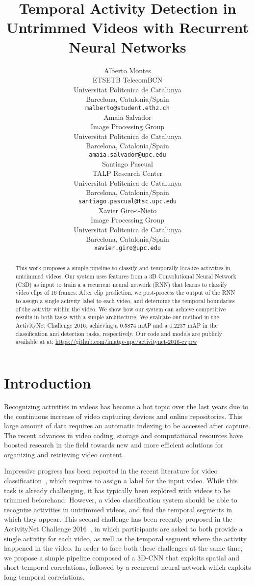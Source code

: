 \documentclass{article}
\title{Temporal Activity Detection in Untrimmed Videos with Recurrent Neural Networks}
\author{
    Alberto Montes \\
    ETSETB TelecomBCN\\
    Universitat Politcnica de Catalunya \\
    Barcelona, Catalonia/Spain \\
    \texttt{malberto@student.ethz.ch} \\
    \And
    Amaia Salvador \\
    Image Processing Group \\
    Universitat Politcnica de Catalunya \\
    Barcelona, Catalonia/Spain \\
    \texttt{amaia.salvador@upc.edu} \\
    \And
    Santiago Pascual \\
    TALP Research Center \\
    Universitat Politcnica de Catalunya \\
    Barcelona, Catalonia/Spain \\
    \texttt{santiago.pascual@tsc.upc.edu} \\
    \And
    Xavier Giro-i-Nieto \\
    Image Processing Group \\
    Universitat Politcnica de Catalunya \\
    Barcelona, Catalonia/Spain \\
    \texttt{xavier.giro@upc.edu} \\
}
\begin{document}
\maketitle

\begin{abstract}


    This work proposes a simple pipeline to classify and temporally localize activities in untrimmed videos. Our system uses features from a 3D Convolutional Neural Network (C3D) as input to train a a recurrent neural network (RNN) that learns to classify video clips of 16 frames. After clip prediction, we post-process the output of the RNN to assign a single activity label to each video, and determine the temporal boundaries of the activity within the video. We show how our system can achieve competitive results in both tasks with a simple architecture. We evaluate our method in the ActivityNet Challenge 2016, achieving a 0.5874 mAP and a 0.2237 mAP in the classification and detection tasks, respectively. Our code and models are publicly available at at: \url{https://github.com/imatge-upc/activitynet-2016-cvprw}

\end{abstract}

\section{Introduction}

Recognizing activities in videos has become a hot topic over the last years due to the continuous increase of video capturing devices and online repositories.
This large amount of data requires an automatic indexing to be accessed after capture.
The recent advances in video coding, storage and computational resources have boosted research in the field towards new and more efficient solutions for organizing and retrieving video content.

Impressive progress has been reported in the recent literature for video classification~\cite{tran2014learning,tran2015deep,wang2015towards,yao2015describing}, which requires to assign a label for the input video. While this task is already challenging, it has typically been explored with videos to be trimmed beforehand.
However, a video classification system should be able to recognize activities in untrimmed videos, and find the temporal segments in which they appear.
This second challenge has been recently proposed in the ActivityNet Challenge 2016~\cite{caba2015activitynet}, in which participants are asked to both provide a single activity for each video, as well as the temporal segment where the activity happened in the video.
In order to face both these challenges at the same time, we propose a simple pipeline composed of a 3D-CNN that exploits spatial and short temporal correlations, followed by a recurrent neural network which exploits long temporal correlations.
\end{document}

